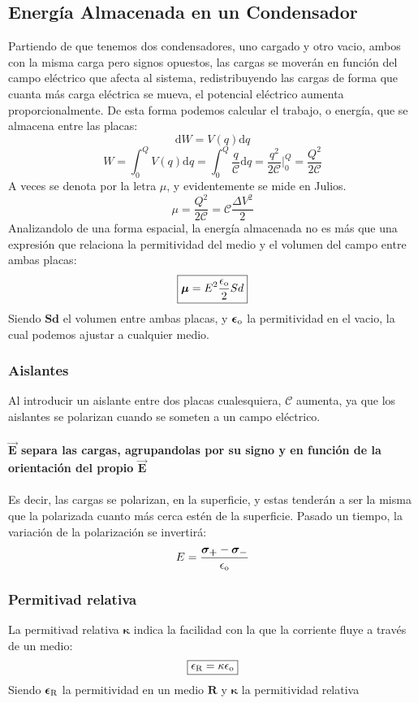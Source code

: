\subsection{Energía Almacenada en un Condensador}
\noindent Partiendo de que tenemos dos condensadores, uno cargado y otro vacio, ambos con la misma carga pero signos opuestos, las cargas se moverán en función del campo eléctrico que afecta al sistema, redistribuyendo las cargas de forma que cuanta más carga eléctrica se mueva, el potencial eléctrico aumenta proporcionalmente. De esta forma podemos calcular el trabajo, o energía, que se almacena entre las placas:
\[
        \mathrm{d}W = V(q)\mathrm{d}q
\]
\[
        W = \int_{0}^{Q} V(q)\mathrm{d}q = \int_{0}^{Q} \frac{q}{\mathcal{C}}\mathrm{d}q = \frac{q^2}{2\mathcal{C}} \Big|^Q_0 =\frac{Q^2}{2\mathcal{C}}
\]
A veces se denota por la letra \(\bm{\mathcal{\mu}}\), y evidentemente se mide en Julios.
\[
        \boxed{\bm{\mathcal{\mu}} = \frac{Q^2}{2\mathcal{C}} = \mathcal{C}\frac{\Delta V^2}{2}}
\]
Analizandolo de una forma espacial, la energía almacenada no es más que una expresión que relaciona la permitividad del medio y el volumen del campo entre ambas placas:
\[
        \boxed{\bm{\mathcal{\mu}} = E^2 \frac{\epsilon_\textnormal{o}}{2}Sd}
\]
Siendo \(\bm{Sd}\) el volumen entre ambas placas, y \(\bm{\epsilon_\textnormal{o}}\) la permitividad en el vacio, la cual podemos ajustar a cualquier medio.
\subsubsection{Aislantes}
\noindent Al introducir un aislante entre dos placas cualesquiera, \(\bm{\mathcal{C}}\) aumenta, ya que los aislantes se polarizan cuando se someten a un campo eléctrico.\\\\ \textbf{\(\bm{\vec{E}}\) separa las cargas, agrupandolas por su signo y en función de la orientación del propio \(\bm{\vec{E}}\)}
\\\\
Es decir, las cargas se polarizan, en la superficie, y estas tenderán a ser la misma que la polarizada cuanto más cerca estén de la superficie. Pasado un tiempo, la variación de la polarización se invertirá:
\[
        E = \frac{\bm{\sigma_+}-\bm{\sigma_-}}{\epsilon_{\textnormal{o}}}
\]
\subsubsection{Permitivad relativa}
\noindent La permitivad relativa \(\bm{\kappa }\) indica la facilidad con la que la corriente fluye a través de un medio:
\[
        \boxed{\epsilon_\textnormal{R} = \kappa \epsilon_\textnormal{o}}
\]
Siendo \(\bm{\epsilon_\textnormal{R}}\) la permitividad en un medio \(\bm{R}\) y \(\bm{\kappa}\) la permitividad relativa
